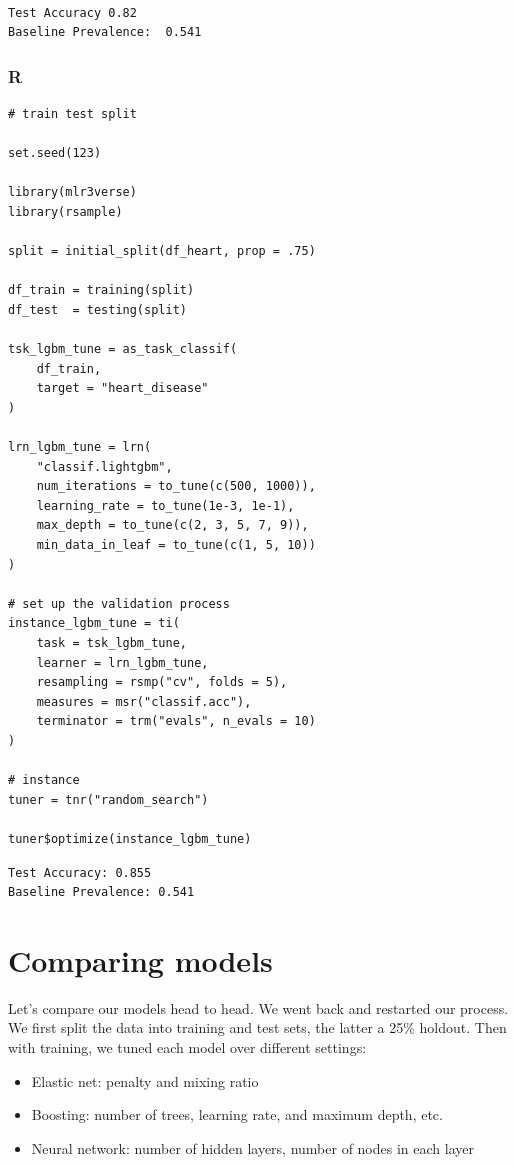 \documentclass[
  letterpaper,
]{krantz}
\providecommand{\tightlist}{%
  \setlength{\itemsep}{0pt}\setlength{\parskip}{0pt}}\usepackage{longtable,booktabs,array}
\begin{document}
\begin{verbatim}

Test Accuracy 0.82 
Baseline Prevalence:  0.541
\end{verbatim}

\subsubsection{R}

\begin{verbatim}
# train test split

set.seed(123)

library(mlr3verse)
library(rsample)

split = initial_split(df_heart, prop = .75)

df_train = training(split)
df_test  = testing(split)

tsk_lgbm_tune = as_task_classif(
    df_train,
    target = "heart_disease"
)

lrn_lgbm_tune = lrn(
    "classif.lightgbm",
    num_iterations = to_tune(c(500, 1000)),
    learning_rate = to_tune(1e-3, 1e-1),
    max_depth = to_tune(c(2, 3, 5, 7, 9)),
    min_data_in_leaf = to_tune(c(1, 5, 10))
)

# set up the validation process
instance_lgbm_tune = ti(
    task = tsk_lgbm_tune,
    learner = lrn_lgbm_tune,
    resampling = rsmp("cv", folds = 5),
    measures = msr("classif.acc"),
    terminator = trm("evals", n_evals = 10)
)

# instance
tuner = tnr("random_search")

tuner$optimize(instance_lgbm_tune)
\end{verbatim}

\begin{verbatim}
Test Accuracy: 0.855
Baseline Prevalence: 0.541
\end{verbatim}

\section{Comparing models}\label{comparing-models}

Let's compare our models head to head. We went back and restarted our
process. We first split the data into training and test sets, the latter
a 25\% holdout. Then with training, we tuned each model over different
settings:

\begin{itemize}
\tightlist
\item
  Elastic net: penalty and mixing ratio
\item
  Boosting: number of trees, learning rate, and maximum depth, etc.
\item
  Neural network: number of hidden layers, number of nodes in each layer
\end{itemize}
\end{document}
